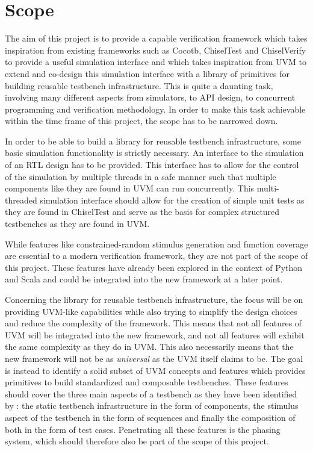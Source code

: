 \section{Scope} %

The aim of this project is to provide a capable verification framework which takes inspiration from existing frameworks such as Cocotb, ChiselTest and ChiselVerify to provide a useful simulation interface and which takes inspiration from UVM to extend and co-design this simulation interface with a library of primitives for building reusable testbench infrastructure. This is quite a daunting task, involving many different aspects from simulators, to API design, to concurrent programming and verification methodology. In order to make this task achievable within the time frame of this project, the scope has to be narrowed down.

In order to be able to build a library for reusable testbench infrastructure, some basic simulation functionality is strictly necessary. An interface to the simulation of an RTL design has to be provided. This interface has to allow for the control of the simulation by multiple threads in a safe manner such that multiple components like they are found in UVM can run concurrently. This multi-threaded simulation interface should allow for the creation of simple unit tests as they are found in ChiselTest and serve as the basis for complex structured testbenches as they are found in UVM.

While features like constrained-random stimulus generation and function coverage are essential to a modern verification framework, they are not part of the scope of this project. These features have already been explored in the context of Python and Scala and could be integrated into the new framework at a later point. 

Concerning the library for reusable testbench infrastructure, the focus will be on providing UVM-like capabilities while also trying to simplify the design choices and reduce the complexity of the framework. This means that not all features of UVM will be integrated into the new framework, and not all features will exhibit the same complexity as they do in UVM. This also necessarily means that the new framework will not be as \textit{universal} as the UVM itself claims to be. The goal is instead to identify a solid subset of UVM concepts and features which provides primitives to build standardized and composable testbenches. These features should cover the three main aspects of a testbench as they have been identified by \citeauthor{sutherland2015uvm} \cite{sutherland2015uvm}: the static testbench infrastructure in the form of components, the stimulus aspect of the testbench in the form of sequences and finally the composition of both in the form of test cases. Penetrating all these features is the phasing system, which should therefore also be part of the scope of this project.

